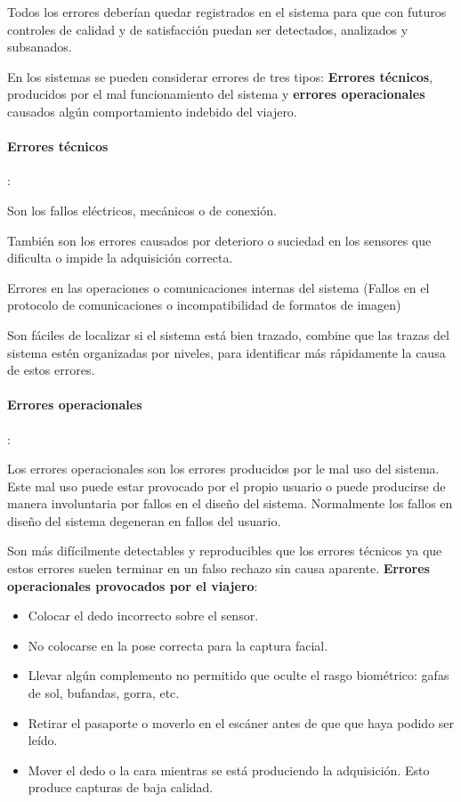 Todos los errores deberían quedar registrados en el sistema para que con futuros controles de calidad y de satisfacción puedan ser detectados, analizados y subsanados.

En los sistemas  se pueden considerar errores de tres tipos: \textbf{Errores técnicos}, producidos por el mal funcionamiento del sistema y \textbf{errores operacionales} causados algún comportamiento indebido del viajero. 

\paragraph{Errores técnicos}:

Son los fallos eléctricos, mecánicos o de conexión.

También son los errores causados por deterioro o suciedad en los sensores que dificulta o impide la adquisición correcta.

Errores en las operaciones o comunicaciones internas del sistema (Fallos en el protocolo de comunicaciones o incompatibilidad de formatos de imagen) 

Son fáciles de localizar si el sistema está bien trazado, combine que las trazas del sistema estén organizadas por niveles, para identificar más rápidamente la causa de estos errores.  

\paragraph{Errores operacionales}:

Los errores operacionales son los errores producidos por le mal uso del sistema. Este mal uso puede estar provocado por el propio usuario o puede producirse de manera involuntaria por fallos en el diseño del sistema. Normalmente los fallos en diseño del sistema degeneran en fallos del usuario. 

Son más difícilmente detectables y reproducibles que los errores técnicos ya que estos errores suelen terminar en un falso rechazo sin causa aparente. 
\textbf{Errores operacionales provocados por el viajero}:
\begin{itemize}
    \item 
    Colocar el dedo incorrecto sobre el sensor.
    \item
    No colocarse en la pose correcta para la captura \gls{facial}.
    \item
    Llevar algún complemento no permitido que oculte el rasgo biométrico: gafas de sol, bufandas, gorra, etc. 
    \item
    Retirar el pasaporte o moverlo en el escáner antes de que que haya podido ser leído. 
    \item
    Mover el dedo o la cara mientras se está produciendo la adquisición. Esto produce capturas de baja calidad.
\end{itemize}

